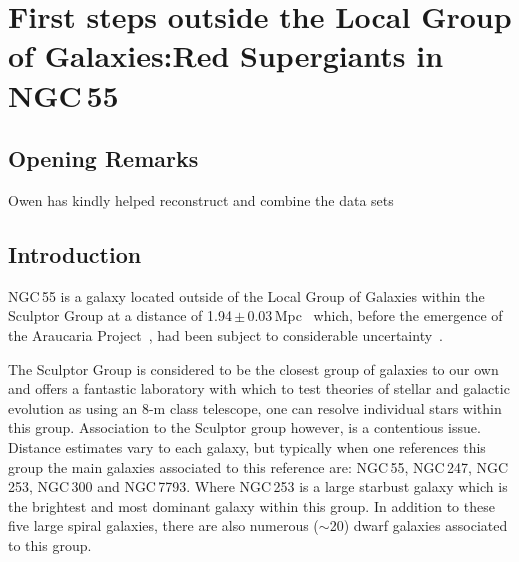 \chapter{First steps outside the Local Group of Galaxies:Red Supergiants in NGC\,55}
\label{ch:ngc55}





\section{Opening Remarks} %
\label{sec:ngc55open}

Owen has kindly helped reconstruct and combine the data sets


\section{Introduction} %
\label{sec:ngc55intro}

NGC\,55 is a galaxy located outside of the Local Group of Galaxies within the Sculptor Group at a distance of 1.94\,$\pm$\,0.03\,Mpc~\citep{2006AJ....132.2556P,2008ApJ...672..266G} which, before the emergence of the Araucaria Project~\citep{2005Msngr.121...23G}, had been subject to considerable uncertainty~\citep[e.g.][]{1987ApJ...323...79P,2006A&A...455..891V}.

The Sculptor Group is considered to be the closest group of galaxies to our own and offers a fantastic laboratory with which to test theories of stellar and galactic evolution as using an 8-m class telescope, one can resolve individual stars within this group.
Association to the Sculptor group however, is a contentious issue.
Distance estimates vary to each galaxy, but typically when one references this group the main galaxies associated to this reference are: NGC\,55, NGC\,247, NGC\,253, NGC\,300 and NGC\,7793.
Where NGC\,253 is a large starbust galaxy which is the brightest and most dominant galaxy within this group.
In addition to these five large spiral galaxies, there are also numerous ($\sim$20) dwarf galaxies associated to this group.

